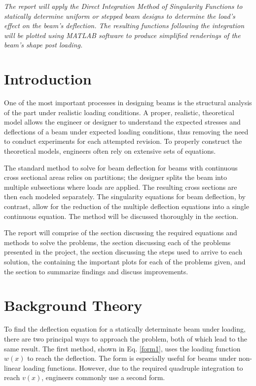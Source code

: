 \documentclass[a4paper]{article}
\begin{document}



\large
\textit{The report will apply the Direct Integration Method of Singularity Functions to statically determine uniform or stepped beam designs to determine the load's effect on the beam's deflection. The resulting functions following the integration will be plotted using MATLAB software to produce simplified renderings of the beam's shape post loading.}

\tableofcontents

\section{Introduction} \label{Introduction}
One of the most important processes in designing beams is the structural analysis of the part under realistic loading conditions. A proper, realistic, theoretical model allows the engineer or designer to understand the expected stresses and deflections of a beam under expected loading conditions, thus removing the need to conduct experiments for each attempted revision. To properly construct the theoretical models, engineers often rely on extensive sets of equations.

The standard method to solve for beam deflection for beams with continuous cross sectional areas relies on partitions; the designer splits the beam into multiple subsections where loads are applied. The resulting cross sections are then each modeled separately. The singularity equations for beam deflection, by contrast, allow for the reduction of the multiple deflection equations into a single continuous equation. The method will be discussed thoroughly in the  section.

The report will comprise of the  section discussing the required equations and methods to solve the problems, the  section discussing each of the problems presented in the project, the  section discussing the steps used to arrive to each solution, the  containing the important plots for each of the problems given, and the  section to summarize findings and discuss improvements.

\section{Background Theory} \label{Background Theory}
To find the deflection equation for a statically determinate beam under loading, there are two principal ways to approach the problem, both of which lead to the same result. The first method, shown in Eq. \ref{form1}, uses the loading function $w(x)$ to reach the deflection. The form is especially useful for beams under non-linear loading functions. However, due to the required quadruple integration to reach $v(x)$, engineers commonly use a second form.
\end{document}
